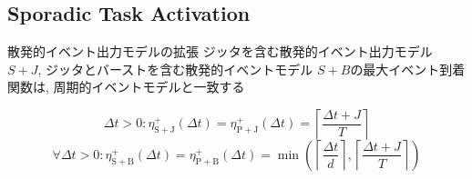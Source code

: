 \subsection{Sporadic Task Activation}
\label{ssec: sporadic task activation}

\begin{frame}{散発的イベント出力モデルの拡張}
    ジッタを含む散発的イベント出力モデル $S+J$, ジッタとバーストを含む散発的イベントモデル $S+B$の最大イベント到着関数は, 周期的イベントモデルと一致する

    \begin{equation*}
        \Delta t>0: \eta_{\mathrm{S}+\mathrm{J}}^{+}(\Delta t)=\eta_{\mathrm{P}+\mathrm{J}}^{+}(\Delta t)=\left\lceil\frac{\Delta t+J}{T}\right\rceil
    \end{equation*}
    \begin{equation*}
        \forall \Delta t>0: \eta_{\mathrm{S}+\mathrm{B}}^{+}(\Delta t)=\eta_{\mathrm{P}+\mathrm{B}}^{+}(\Delta t)=\min \left(\left\lceil\frac{\Delta t}{d}\right\rceil,\left\lceil\frac{\Delta t+J}{T}\right\rceil\right)
    \end{equation*}
\end{frame}




